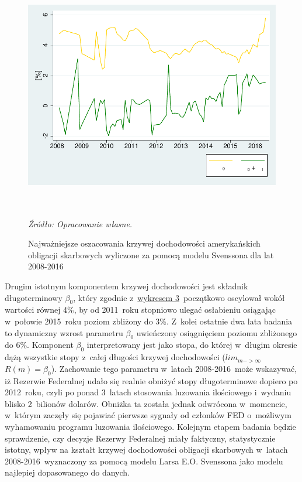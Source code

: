 \hypertarget{fig3}{}
\begin{figure}[h]
\vspace{0.25cm}
\begin{centering}
  \includegraphics[height=4in]{Rysunki//Bety}
    \captionsetup{format=hang}
    \caption{Najważniejsze oszacowania krzywej dochodowości amerykańskich obligacji skarbowych wyliczone za pomocą modelu Svenssona dla lat 2008-2016}
\end{centering}
\begin{flushleft}
\hspace{1cm}\textit{\footnotesize{Źródło: Opracowanie własne.}} \\
\end{flushleft}
\vspace{-0.25cm}
\end{figure} 

Drugim istotnym komponentem krzywej dochodowości jest składnik długoterminowy $\beta_0$, który zgodnie z~\hyperlink{fig3}{wykresem 3}~początkowo oscylował wokół wartości równej 4\%, by od 2011~roku stopniowo ulegać osłabieniu osiągając w~połowie 2015~roku poziom zbliżony do 3\%. Z~kolei ostatnie dwa lata badania to dynamiczny wzrost parametru $\beta_0$ uwieńczony osiągnięciem poziomu zbliżonego do 6\%. Komponent $\beta_0$ interpretowany jest jako stopa, do której w~długim okresie dążą wszystkie stopy z~całej długości krzywej dochodowości ($lim_{m-> \infty}$ $R(m) = \beta_0$). Zachowanie tego parametru w~latach 2008-2016~może wskazywać, iż Rezerwie Federalnej udało się realnie obniżyć stopy długoterminowe dopiero po 2012~roku, czyli po ponad 3~latach stosowania luzowania ilościowego i~wydaniu blisko 2~bilionów dolarów. Obniżka ta została jednak odwrócona w~momencie, w~którym zaczęły się pojawiać pierwsze sygnały od członków \acs{FED} o~możliwym wyhamowaniu programu luzowania ilościowego. Kolejnym etapem badania będzie sprawdzenie, czy decyzje Rezerwy Federalnej miały faktyczny, statystycznie istotny, wpływ na kształt krzywej dochodowości obligacji skarbowych w~latach 2008-2016~wyznaczony za pomocą modelu Larsa E.O. Svenssona jako modelu najlepiej dopasowanego do danych.

